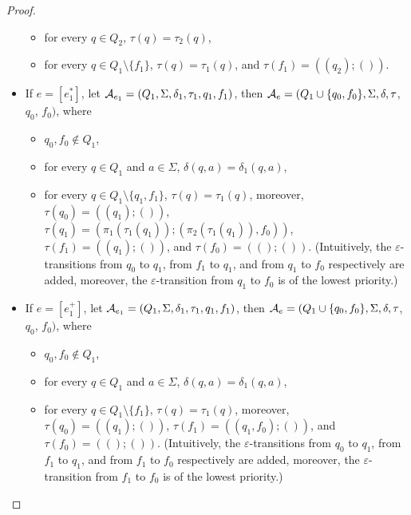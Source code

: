 \begin{proof}
\begin{itemize}
\begin{itemize}
    \item for every $q \in Q_2$, $\tau(q) = \tau_2(q)$, 
%
    \item for every $q \in Q_1 \setminus \{f_1\}$, $\tau(q) = \tau_1(q)$, and $\tau(f_1) = ((q_2); ())$.
  \end{itemize}
%  
  \item If $e = [e_1^{\ast}]$, let  $\mathcal{A}_{e_1} = (Q_1,
  \Sigma, \delta_1, \tau_1, q_1, f_1)$, then $\mathcal{A}_e = (Q_1 \cup \{q_0, f_0\}, \Sigma,
  \delta, \tau$, $q_0$, $f_0)$, where 
  \begin{itemize}
  \item $q_0, f_0 \not \in Q_1$,
  
    \item for every $q \in Q_1$ and $a \in \Sigma$, $\delta(q, a) = \delta_1(q, a)$, 
    
    \item for every $q \in Q_1 \setminus \{q_1, f_1\}$,  $\tau(q) = \tau_1(q)$, moreover, $\tau(q_0) = ((q_1); ())$, $\tau(q_1) = (\pi_1(\tau_1(q_1)); (\pi_2(\tau_1(q_1)), f_0))$, $\tau(f_1) = ((q_1); ())$, and $\tau(f_0) = ((); ())$. (Intuitively, the $\varepsilon$-transitions from $q_0$ to $q_1$, from $f_1$ to $q_1$, and from $q_1$ to $f_0$ respectively are added, moreover, the $\varepsilon$-transition from $q_1$ to $f_0$ is of the lowest priority.)
  \end{itemize}
%
  \item If $e = [e_1^{+}]$, let  $\mathcal{A}_{e_1} = (Q_1,
  \Sigma, \delta_1, \tau_1, q_1, f_1)$, then $\mathcal{A}_e = (Q_1 \cup \{q_0, f_0\}, \Sigma,
  \delta, \tau$, $q_0$, $f_0)$, where 
  \begin{itemize}
  \item $q_0, f_0 \not \in Q_1$,
  
    \item for every $q \in Q_1$ and $a \in \Sigma$, $\delta(q, a) = \delta_1(q, a)$, 
    
    \item for every $q \in Q_1 \setminus \{f_1\}$,  $\tau(q) = \tau_1(q)$, moreover, $\tau(q_0) = ((q_1); ())$, $\tau(f_1) = ((q_1,f_0); ())$, and $\tau(f_0) = ((); ())$. (Intuitively, the $\varepsilon$-transitions from $q_0$ to $q_1$, from $f_1$ to $q_1$, and from $f_1$ to $f_0$ respectively are added, moreover, the $\varepsilon$-transition from $f_1$ to $f_0$ is of the lowest priority.)
  \end{itemize}


\end{itemize}
\end{proof}
